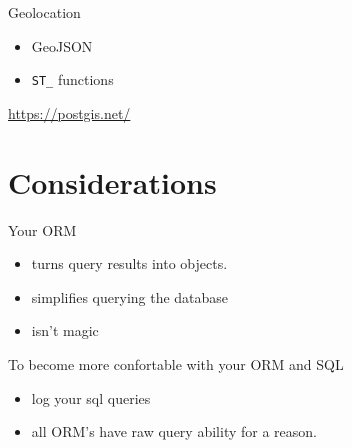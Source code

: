 \documentclass[presentation]{beamer}
\begin{document}
\begin{frame}[label={sec:org423d70e},fragile]{Geolocation}
 \begin{itemize}
\item GeoJSON
\item \texttt{ST\_} functions
\end{itemize}

\url{https://postgis.net/}
\end{frame}

\section{Considerations}
\label{sec:org44304b4}

\begin{frame}[label={sec:org72e20a9}]{Your ORM}
\begin{itemize}
\item turns query results into objects.
\item simplifies querying the database
\item isn't magic
\end{itemize}

To become more confortable with your ORM and SQL

\begin{itemize}
\item log your sql queries
\item all ORM's have raw query ability for a reason.
\end{itemize}
\end{frame}
\end{document}
